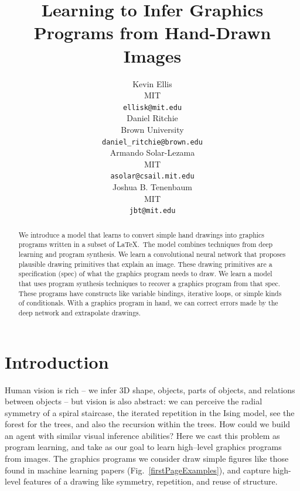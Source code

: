 \documentclass{article}
\title{Learning to Infer Graphics Programs from Hand-Drawn Images}
\author{Kevin Ellis\\
  MIT\\
  \texttt{ellisk@mit.edu} \\
  \And
  Daniel Ritchie\\
Brown University\\
 \texttt{daniel\_ritchie@brown.edu} \\
 \And
 Armando Solar-Lezama\\
 MIT\\
\texttt{asolar@csail.mit.edu} \\
\And
Joshua B. Tenenbaum \\
MIT\\
\texttt{jbt@mit.edu}
}
\theoremstyle{definition}
\begin{document}

\maketitle

\begin{abstract}
  We introduce a model that learns to convert simple hand drawings
  into graphics programs written in a subset of \LaTeX.~The model
  combines techniques from deep learning and program synthesis.  We
  learn a convolutional neural network that proposes plausible drawing
  primitives that explain an image. These drawing primitives are a
  specification (spec) of what the graphics program needs to draw.
  We learn a model that uses program synthesis techniques to
  recover a graphics program from that spec. These programs have
  constructs like variable bindings, iterative loops, or simple kinds
  of conditionals. With a graphics program in hand, we can correct
  errors made by the deep network and extrapolate drawings.  %
\end{abstract}

\section{Introduction}

Human vision is rich -- we infer 3D shape, objects, parts of objects,
and relations between objects -- but vision is also abstract:
we can perceive the radial symmetry of a spiral staircase,
the iterated repetition in the Ising model,
see the forest for the trees, and also the recursion within the trees.
How could we build an agent with similar visual inference abilities?
Here we
cast this problem as program learning,
and take as our goal to learn high--level
graphics programs from images.
The graphics programs we consider draw simple figures like those found in machine learning papers
(Fig.~\ref{firstPageExamples}),
and capture high-level features of a drawing like
symmetry, repetition, and reuse of structure.

\end{document}
